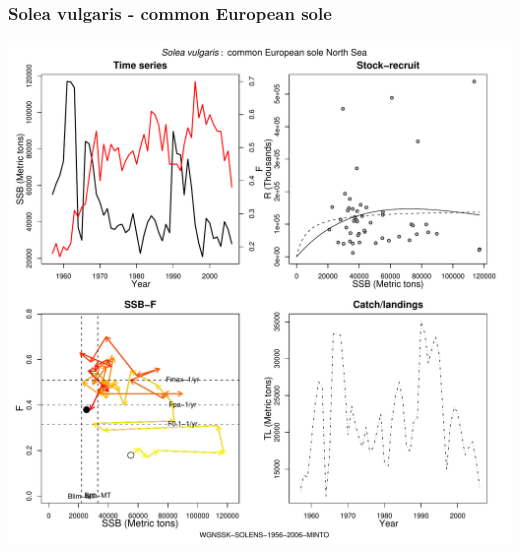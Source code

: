 \subsubsection{Solea vulgaris - common European sole}
\begin{center}
\includegraphics[width=1.2\textwidth]{../R/figures/WGNSSK-SOLENS-1956-2006-MINTO.pdf}
\end{center}

